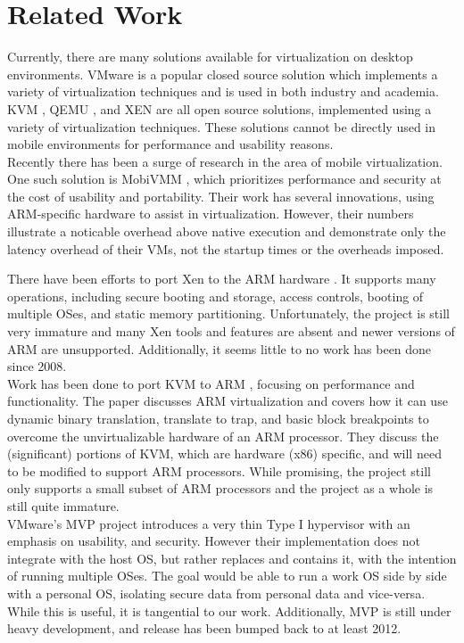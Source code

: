 \section{Related Work}
\label{sec:related}
Currently, there are many solutions available for virtualization on desktop environments.  VMware is a popular closed source solution which implements a variety of virtualization techniques and is used in both industry and academia.  KVM \cite{kvm}, QEMU \cite{qemu}, and XEN \cite{xen} are all open source solutions, implemented using a variety of virtualization techniques.  These solutions cannot be directly used in mobile environments for performance and usability reasons. \\

Recently there has been a surge of research in the area of mobile virtualization.  One such solution is MobiVMM \cite{mobivmm}, which prioritizes performance and security at the cost of usability and portability.  Their work has several innovations, using ARM-specific hardware to assist in virtualization.  However, their numbers illustrate a noticable overhead above native execution and demonstrate only the latency overhead of their VMs, not the startup times or the overheads imposed.

There have been efforts to port Xen to the ARM hardware \cite{xen}.  It supports many operations, including secure booting and storage, access controls, booting of multiple OSes, and static memory partitioning.  Unfortunately, the project is still very immature and many Xen tools and features are absent and newer versions of ARM are unsupported.  Additionally, it seems little to no work has been done since 2008. \\

Work has been done to port KVM to ARM \cite{columbia}, focusing on performance and functionality.  The paper discusses ARM virtualization and covers how it can use dynamic binary translation, translate to trap, and basic block breakpoints to overcome the unvirtualizable hardware of an ARM processor.  They discuss the (significant) portions of KVM, which are hardware (x86) specific, and will need to be modified to support ARM processors.  While promising, the project still only supports a small subset of ARM processors and the project as a whole is still quite immature.  \\
 
VMware's MVP project \cite{mvp} introduces a very thin Type I hypervisor with an emphasis on usability, and security.  However their implementation does not integrate with the host OS, but rather replaces and contains it, with the intention of running multiple OSes.  The goal would be able to run a work OS side by side with a personal OS, isolating secure data from personal data and vice-versa.  While this is useful, it is tangential to our work.  Additionally, MVP is still under heavy development, and release has been bumped back to at least 2012.  \\

